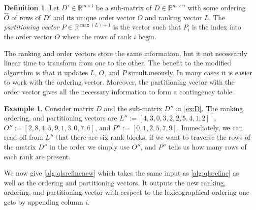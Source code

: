 \documentclass[a4paper,10pt,reqno]{amsart}
\newcommand\R{\mathbb R}
\theoremstyle{definition}
\newtheorem{definition}{Definition}
\newtheorem{example}{Example}
\begin{document}
\begin{definition}
Let $D' \in \R^{m \times l}$ be a sub-matrix of $D \in \R^{m \times n}$
with some ordering $\widehat O$ of rows of $D'$ and its unique order
vector $O$ and ranking vector $L$.
The \emph{partitioning vector} $P \in \R^{\max(L)+1}$ is the vector such that
$P_i$ is the index into the order vector $O$ where the rows of rank $i$
begin.
\end{definition}

The ranking and order vectors store the same information, but it not
necessarily linear time to transform from one to the other. The benefit to the
modified algorithm is that it updates $L$, $O$, and $P$ simultaneously. In many
cases it is easier to work with the ordering vector. Moreover, the partitioning
vector with the order vector gives all the necessary information to form a
contingency table.

\begin{example}
Consider matrix $D$ and the sub-matrix $D''$ in \autoref{ex:D}. The ranking,
ordering, and partitioning vectors are $L'' := [4,3,0,3,2,2,5,4,1,2]^\top$,
$O'' := [2,8,4,5,9,1,3,0,7,6]$, and $P'' := [0,1,2,5,7,9]$. Immediately, we can read off
from $L''$ that there are six rank blocks, if we want to traverse the rows
of the matrix $D''$ in the order we simply use $O''$, and $P''$ tells us how many rows
of each rank are present.
\end{example}


We now give \autoref{alg:qlsrefinenew} which takes the same input as
\autoref{alg:qlsrefine} as well as the ordering and partitioning vectors. It
outputs the new ranking, ordering, and partitioning vector with respect to the
lexicographical ordering one gets by appending column $i$.
\end{document}
